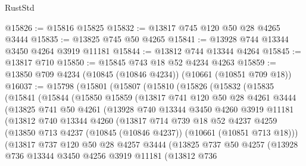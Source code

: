 \begin{lexlean}{RustStd}
\begin{coremodule}
@15826 := @15816 @15825
@15832 := @13817 @745 @120 @50 @28 @4265 @3444
@15835 := @13825 @745 @50 @4265
@15841 := @13928 @744 @13344 @3450 @4264 @3919 @11181
@15844 := @13812 @744 @13344 @4264
@15845 := @13817 @710
@15850 := @15845 @743 @18 @52 @4234 @4263
@15859 := @13850 @709 @4234 (@10845 (@10846 @4234)) (@10661 (@10851 @709 @18))
@16037 := @15798
    (@15801
      (@15807
        (@15810
          (@15826
            (@15832
              (@15835
                (@15841
                  (@15844
                    (@15850
                      @15859
                      (@13817
                        @741
                        @120
                        @50
                        @28
                        @4261
                        @3444
                        (@13825
                          @741
                          @50
                          @4261
                          (@13928
                            @740
                            @13344
                            @3450
                            @4260
                            @3919
                            @11181
                            (@13812
                              @740
                              @13344
                              @4260
                              (@13817
                                @714
                                @739
                                @18
                                @52
                                @4237
                                @4259
                                (@13850
                                  @713
                                  @4237
                                  (@10845 (@10846 @4237))
                                  (@10661 (@10851 @713 @18)))
                                (@13817
                                  @737
                                  @120
                                  @50
                                  @28
                                  @4257
                                  @3444
                                  (@13825
                                    @737
                                    @50
                                    @4257
                                    (@13928
                                      @736
                                      @13344
                                      @3450
                                      @4256
                                      @3919
                                      @11181
                                      (@13812
                                        @736

\end{coremodule}
\end{lexlean}
